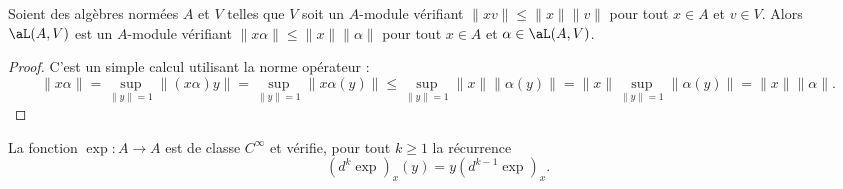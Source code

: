 \begin{lemma}   \label{LEMooTUWQooMCCDcm}
	Soient des algèbres normées \( A\) et \( V\) telles que \( V\) soit un \( A\)-module vérifiant \( \| xv \|\leq \| x \|\| v \|\) pour tout \( x\in A\) et \( v\in V\). Alors \( \aL(A,V)\) est un \( A\)-module vérifiant \( \| x\alpha \|\leq \| x \|\|\alpha  \|\) pour tout \( x\in A\) et \( \alpha\in \aL(A,V)\).
\end{lemma}

\begin{proof}
	C'est un simple calcul utilisant la norme opérateur :
	\begin{equation}
		\| x\alpha \|=\sup_{\| y \|=1}\| (x\alpha)y \|
		=\sup_{\| y \|=1}\| x\alpha(y) \|
		\leq \sup_{\| y \|=1}\| x \|\| \alpha(y) \|
		=\| x \|\sup_{\| y \|=1}\| \alpha(y) \|
		=\| x \|\| \alpha \|.
	\end{equation}
\end{proof}

\begin{proposition}      \label{PROPooTBDAooQouzSk}
	La fonction \( \exp\colon A\to A\) est de classe \(  C^{\infty}\) et vérifie, pour tout \( k\geq 1\) la récurrence
	\begin{equation}
		(d^k\exp)_x(y)=y(d^{k-1}\exp)_x.
	\end{equation}
\end{proposition}

